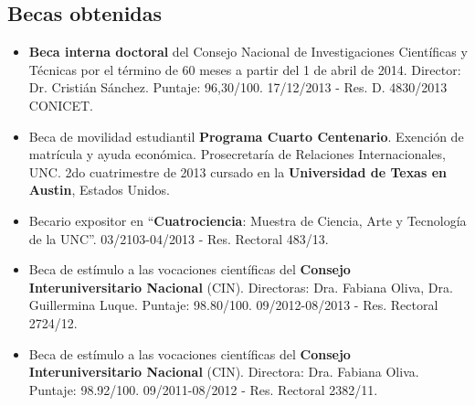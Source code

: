 \documentclass[10pt]{article}
\begin{document}
  \subsection{Becas obtenidas}
  \begin{itemize}
   \item {\bf Beca interna doctoral} del Consejo Nacional de Investigaciones Científicas y Técnicas por el término de 60 meses a partir del 1 de abril de 2014. Director: Dr. Cristián Sánchez. Puntaje: 96,30/100. 17/12/2013 - Res. D. 4830/2013 CONICET.
   \item Beca de movilidad estudiantil {\bf Programa Cuarto Centenario}. Exención de matrícula y ayuda económica. Prosecretaría de Relaciones Internacionales, UNC. 2do cuatrimestre de 2013 cursado en la {\bf Universidad de Texas en Austin}, Estados Unidos.
   \item Becario expositor en ``{\bf Cuatrociencia}: Muestra de Ciencia, Arte y Tecnología de la UNC''. 03/2103-04/2013 - Res. Rectoral 483/13.
   \item Beca de estímulo a las vocaciones científicas del {\bf Consejo Interuniversitario Nacional} (CIN). 
   Directoras: Dra. Fabiana Oliva, Dra. Guillermina Luque. Puntaje: 98.80/100. 09/2012-08/2013 - Res. Rectoral 2724/12.
   \item Beca de estímulo a las vocaciones científicas del {\bf Consejo Interuniversitario Nacional} (CIN). 
   Directora: Dra. Fabiana Oliva. Puntaje: 98.92/100. 09/2011-08/2012 - Res. Rectoral 2382/11.
  \end{itemize}
\end{document}
